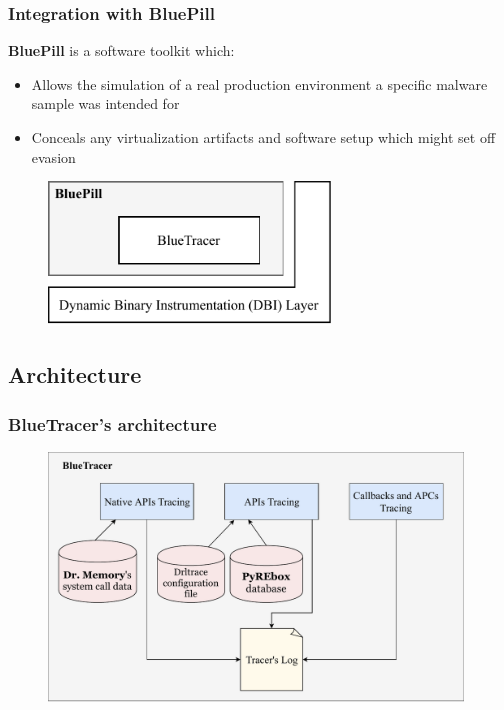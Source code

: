 \documentclass[compress]{beamer}
\begin{document}
\begin{frame}
    \frametitle{Integration with BluePill}
	\textbf{BluePill} is a software toolkit which:
	\begin{itemize}
	\item Allows the simulation of a real production environment a specific malware
sample was intended for
	\item Conceals any virtualization artifacts and software setup which might set off
evasion
	\end{itemize}
	\medskip
	
	    \begin{figure}
    	\vspace{-0.3cm}
        \includegraphics[width=7.5cm]{image/BluePill.pdf}
    \end{figure}

\end{frame}
\fi

\subsection{Architecture}

\begin{frame}
    \frametitle{BlueTracer's architecture}
    
    \begin{figure}
    	\vspace{-0.5cm}
        \includegraphics[width=11cm]{image/BlueTracer.pdf}
    \end{figure}
    
	

\end{frame}
\end{document}
